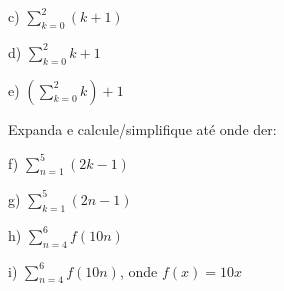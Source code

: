 \documentclass[oneside,12pt]{article}
\begin{document}
{{  c) $\sum_{k=0}^2 (k+1)$
  
  \msk
  
  d) $\sum_{k=0}^2 k + 1$
  
  \msk
  
  e) $\left( \sum_{k=0}^2 k \right) +1$
  
  \msk
  
  Expanda e calcule/simplifique até onde der:
  
  f) $\sum_{n=1}^5 (2k-1)$
  
  \ssk
  
  g) $\sum_{k=1}^5 (2n-1)$
  
  \ssk
  
  h) $\sum_{n=4}^6 f(10n)$
  
  \ssk

  i) $\sum_{n=4}^6 f(10n)$, onde $f(x) = 10x$

}}


















\end{document}
